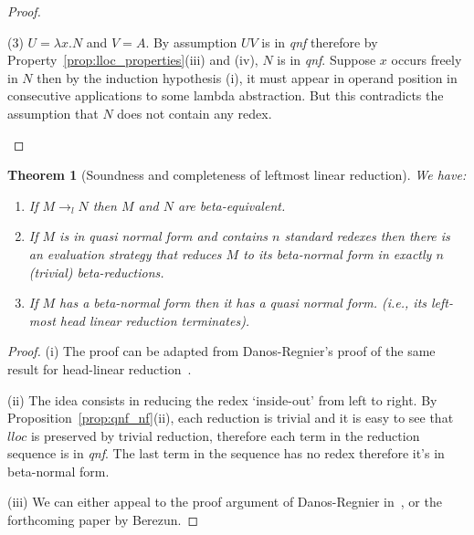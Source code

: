 \documentclass{article}
\makeatletter
\theoremstyle{plain}
\newtheorem{theorem}{Theorem}[section]
\theoremstyle{definition}
\theoremstyle{remark}
\renewcommand\ie{{\it i.e.\@\xspace}}
\makeatother
\begin{document}
\begin{proof}
\begin{compactitem}
\begin{compactitem}
  \item[(3)] $U = \lambda x . N$ and $V = A$.
  By assumption $UV$ is in \emph{qnf} therefore by Property~\ref{prop:lloc_properties}(iii) and (iv), $N$ is in \emph{qnf}.
  Suppose $x$ occurs freely in $N$ then by the induction hypothesis (i), it must appear in operand position in consecutive applications to some lambda abstraction. But this contradicts the assumption that $N$ does not contain any redex.
\end{compactitem}
\end{compactitem}
\end{proof}

\begin{theorem}[Soundness and completeness of leftmost linear reduction]
\label{thm:soundness_leftmostlinearred}
We have:
\begin{enumerate}[label=(\roman*)]
\item If $M \rightarrow_{l} N$ then $M$ and $N$ are beta-equivalent.
\item If $M$ is in \emph{quasi normal form} and contains $n$ standard redexes then there is an evaluation strategy that reduces $M$ to its beta-normal form in exactly $n$ (trivial) beta-reductions.
\item If $M$ has a beta-normal form then it has a \emph{quasi normal form}. (\ie, its left-most head linear reduction terminates).
\end{enumerate}
\end{theorem}
\begin{proof}
(i) The proof can be adapted from Danos-Regnier's proof of the same result for head-linear reduction~\cite{danos-head}.

(ii) The idea consists in reducing the redex `inside-out' from left to right. By Proposition~\ref{prop:qnf_nf}(ii), each reduction is trivial and it is easy to see that  $lloc$ is preserved by trivial reduction, therefore each term in the reduction sequence is in \emph{qnf}. The last term in the sequence has no redex therefore it's in beta-normal form.

(iii) We can either appeal to the proof argument of Danos-Regnier in~\cite{danos-head}, or the forthcoming paper by Berezun\cite{DaniilBerezun_Soundness}.
\end{proof}
\end{document}
